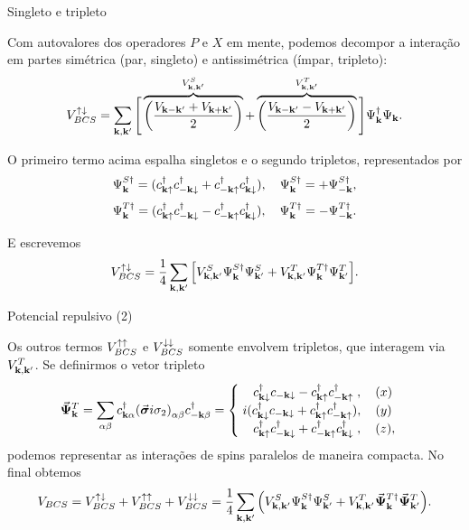 \documentclass[8pt,aspectratio=169,xcolor={table,dvipsnames,usenames}]{beamer}
\begin{document}

\begin{frame}{Singleto e tripleto}

Com autovalores dos operadores $P$ e $X$ em mente, podemos decompor a interação em partes simétrica (par, singleto) e antissimétrica (ímpar, tripleto):
$$
V_{BCS}^{\uparrow\downarrow} = \sum_{\vb{k},\vb{k}'}
\Bigg[
\overbrace{\qty(\frac{V_{\vb{k}-\vb{k}'} + V_{\vb{k}+\vb{k}'}}{2})}^{V_{\vb{k},\vb{k}'}^S} +
\overbrace{\qty(\frac{V_{\vb{k}-\vb{k}'} - V_{\vb{k}+\vb{k}'}}{2})}^{V_{\vb{k},\vb{k}'}^T}
\Bigg] \Psi_{\vb{k}}^\dagger \Psi_{\vb{k}}.
$$

O primeiro termo acima espalha singletos e o segundo tripletos, representados por
$$
\Psi_{\vb{k}}^{S\dagger} = (c_{\vb{k}\uparrow}^\dagger c_{-\vb{k}\downarrow}^\dagger + c_{-\vb{k}\uparrow}^\dagger c_{\vb{k}\downarrow}^\dagger),
\quad \Psi_{\vb{k}}^{S\dagger} = +\Psi_{-\vb{k}}^{S\dagger},
$$
$$
\Psi_{\vb{k}}^{T\dagger} = (c_{\vb{k}\uparrow}^\dagger c_{-\vb{k}\downarrow}^\dagger - c_{-\vb{k}\uparrow}^\dagger c_{\vb{k}\downarrow}^\dagger),
\quad \Psi_{\vb{k}}^{T\dagger} = -\Psi_{-\vb{k}}^{T\dagger}.
$$

E escrevemos
$$
V_{BCS}^{\uparrow\downarrow} =
\frac{1}{4} \sum_{\vb{k},\vb{k}'}
\qty[
V_{\vb{k},\vb{k}'}^S \Psi_{\vb{k}}^{S\dagger} \Psi_{\vb{k}'}^{S} +
V_{\vb{k},\vb{k}'}^T \Psi_{\vb{k}}^{T\dagger} \Psi_{\vb{k}'}^{T}
].
$$

\end{frame}



\begin{frame}{Potencial repulsivo (2)}

Os outros termos $V_{BCS}^{\uparrow\uparrow}$ e $V_{BCS}^{\downarrow\downarrow}$ somente envolvem tripletos, que interagem via $V_{\vb{k},\vb{k}'}^T$. Se definirmos o vetor tripleto
$$
\va*{\Psi}_{\vb{k}}^T = \sum_{\alpha\beta} c_{\vb{k}\alpha}^\dagger \qty(\va*{\sigma} i \sigma_2)_{\alpha\beta} c_{-\vb{k}\beta}^\dagger =
\begin{cases}
\; \; \; \; c_{\vb{k}\downarrow}^\dagger c_{-\vb{k}\downarrow} - c_{\vb{k}\uparrow}^\dagger c_{-\vb{k}\uparrow}^\dagger \; , \quad (x) \\
\; i (c_{\vb{k}\downarrow}^\dagger c_{-\vb{k}\downarrow} + c_{\vb{k}\uparrow}^\dagger c_{-\vb{k}\uparrow}^\dagger), \quad (y) \\
\; \; \; \; c_{\vb{k}\uparrow}^\dagger c_{-\vb{k}\downarrow}^\dagger + c_{-\vb{k}\uparrow}^\dagger c_{\vb{k}\downarrow}^\dagger \; , \quad (z),
\end{cases}
$$
podemos representar as interações de spins paralelos de maneira compacta. No final obtemos
$$
V_{BCS} =
V_{BCS}^{\uparrow\downarrow} + V_{BCS}^{\uparrow\uparrow} + V_{BCS}^{\downarrow\downarrow} =
\frac{1}{4} \sum_{\vb{k},\vb{k}'}
\qty(
V_{\vb{k},\vb{k}'}^S \Psi_{\vb{k}}^{S\dagger} \Psi_{\vb{k}'}^S +
V_{\vb{k},\vb{k}'}^T \va*{\Psi}_{\vb{k}}^{T\dagger} \va*{\Psi}_{\vb{k}'}^T
).
$$

\end{frame}
\end{document}
